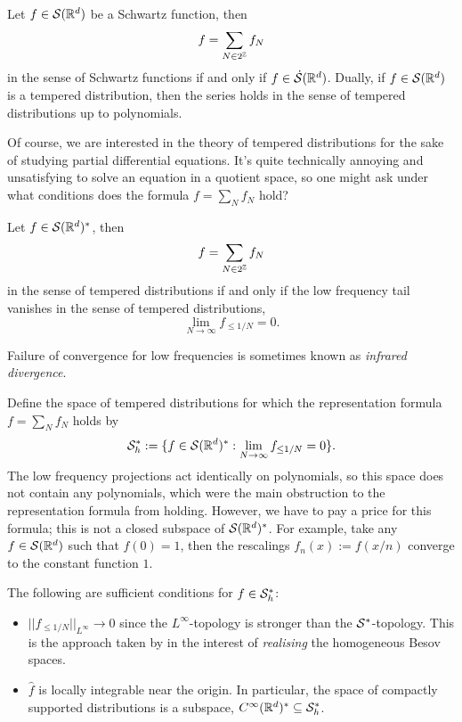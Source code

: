 \begin{proposition}
	Let $f \in \mathcal S (\mathbb R^d)$ be a Schwartz function, then 
		\[ f = \sum_{N \in 2^\mathbb Z} f_N \]
	in the sense of Schwartz functions if and only if $f \in \dot {\mathcal S} (\mathbb R^d)$. Dually, if $f \in \mathcal S (\mathbb R^d)$ is a tempered distribution, then the series holds in the sense of tempered distributions up to polynomials. 	
\end{proposition}

Of course, we are interested in the theory of tempered distributions for the sake of studying partial differential equations. It's quite technically annoying and unsatisfying to solve an equation in a quotient space, so one might ask under what conditions does the formula $f = \sum_N f_N$ hold? 

\begin{proposition}
	Let $f \in \mathcal S(\mathbb R^d)^*$, then 
		\[ f = \sum_{N \in 2^\mathbb Z} f_N \]
	in the sense of tempered distributions if and only if the low frequency tail vanishes in the sense of tempered distributions,
		\[ \lim_{N \to \infty} f_{\leq 1/N} = 0. \]	
\end{proposition}

\begin{remark}
	Failure of convergence for low frequencies is sometimes known as \textit{infrared divergence}. 
\end{remark}

Define the space of tempered distributions for which the representation formula $f = \sum_N f_N$ holds by 
	\[ \mathcal S_h^* := \{ f \in \mathcal S (\mathbb R^d)^* :  \lim_{N \to \infty} f_{\leq 1/N} = 0\}.  \]
The low frequency projections act identically on polynomials, so this space does not contain any polynomials, which were the main obstruction to the representation formula from holding. However, we have to pay a price for this formula; this is not a closed subspace of $\mathcal S (\mathbb R^d)^*$. For example, take any $f \in \mathcal S (\mathbb R^d)$ such that $f (0) = 1$, then the rescalings $f_n (x) := f(x/n)$ converge to the constant function $1$. 
\begin{example}
	The following are sufficient conditions for $f \in \mathcal S_h^*$:
\begin{itemize}
		\item $||f_{\leq 1/N}||_{L^\infty} \to 0$ since the $L^\infty$-topology is stronger than the $\mathcal S^*$-topology. This is the approach taken by \cite{BahouriEtAl2011} in the interest of \textit{realising} the homogeneous Besov spaces. 
		
		\item $\widehat f$ is locally integrable near the origin. In particular, the space of compactly supported distributions is a subspace, $C^\infty (\mathbb R^d)^* \subseteq \mathcal S^*_h$. 
\end{itemize}
\end{example}	




